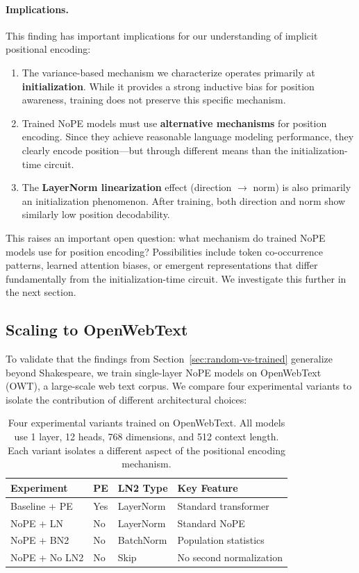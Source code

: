 \documentclass[11pt]{article}
\begin{document}
\paragraph{Implications.} This finding has important implications for our understanding of implicit positional encoding:
\begin{enumerate}
    \item The variance-based mechanism we characterize operates primarily at \textbf{initialization}. While it provides a strong inductive bias for position awareness, training does not preserve this specific mechanism.
    \item Trained NoPE models must use \textbf{alternative mechanisms} for position encoding. Since they achieve reasonable language modeling performance, they clearly encode position---but through different means than the initialization-time circuit.
    \item The \textbf{LayerNorm linearization} effect (direction $\rightarrow$ norm) is also primarily an initialization phenomenon. After training, both direction and norm show similarly low position decodability.
\end{enumerate}

This raises an important open question: what mechanism do trained NoPE models use for position encoding? Possibilities include token co-occurrence patterns, learned attention biases, or emergent representations that differ fundamentally from the initialization-time circuit. We investigate this further in the next section.

\subsection{Scaling to OpenWebText}\label{sec:owt-experiments}

To validate that the findings from Section~\ref{sec:random-vs-trained} generalize beyond Shakespeare, we train single-layer NoPE models on OpenWebText (OWT), a large-scale web text corpus. We compare four experimental variants to isolate the contribution of different architectural choices:

\begin{table}[htbp]
\centering
\small
\begin{tabular}{llll}
\toprule
\textbf{Experiment} & \textbf{PE} & \textbf{LN2 Type} & \textbf{Key Feature} \\
\midrule
Baseline + PE & Yes & LayerNorm & Standard transformer \\
NoPE + LN & No & LayerNorm & Standard NoPE \\
NoPE + BN2 & No & BatchNorm & Population statistics \\
NoPE + No LN2 & No & Skip & No second normalization \\
\bottomrule
\end{tabular}
\caption{Four experimental variants trained on OpenWebText. All models use 1 layer, 12 heads, 768 dimensions, and 512 context length. Each variant isolates a different aspect of the positional encoding mechanism.}
\label{tab:owt-variants}
\end{table}
\end{document}
